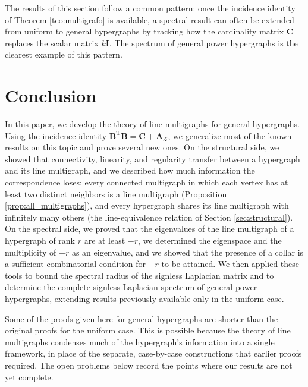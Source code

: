 \documentclass[12pt,reqno]{amsart}
\begin{document}
The results of this section follow a common pattern: once the incidence identity of Theorem \ref{teo:multigrafo} is available, a spectral result can often be extended from uniform to general hypergraphs by tracking how the cardinality matrix $\mathbf{C}$ replaces the scalar matrix $k\mathbf{I}$. The spectrum of general power hypergraphs is the clearest example of this pattern.

\section{Conclusion}\label{sec:conclusion}

In this paper, we develop the theory of line multigraphs for general hypergraphs. Using the incidence identity $\mathbf{B}^\mathrm{T}\mathbf{B} = \mathbf{C} + \mathbf{A}_{\mathcal{L}}$, we generalize most of the known results on this topic and prove several new ones. On the structural side, we showed that connectivity, linearity, and regularity transfer between a hypergraph and its line multigraph, and we described how much information the correspondence loses: every connected multigraph in which each vertex has at least two distinct neighbors is a line multigraph (Proposition \ref{prop:all_multigraphs}), and every hypergraph shares its line multigraph with infinitely many others (the line-equivalence relation of Section \ref{sec:structural}). On the spectral side, we proved that the eigenvalues of the line multigraph of a hypergraph of rank $r$ are at least $-r$, we determined the eigenspace and the multiplicity of $-r$ as an eigenvalue, and we showed that the presence of a collar is a sufficient combinatorial condition for $-r$ to be attained. We then applied these tools to bound the spectral radius of the signless Laplacian matrix and to determine the complete signless Laplacian spectrum of general power hypergraphs, extending results previously available only in the uniform case.



Some of the proofs given here for general hypergraphs are shorter than the original proofs for the uniform case. This is possible because the theory of line multigraphs condenses much of the hypergraph's information into a single framework, in place of the separate, case-by-case constructions that earlier proofs required. The open problems below record the points where our results are not yet complete.
\end{document}

